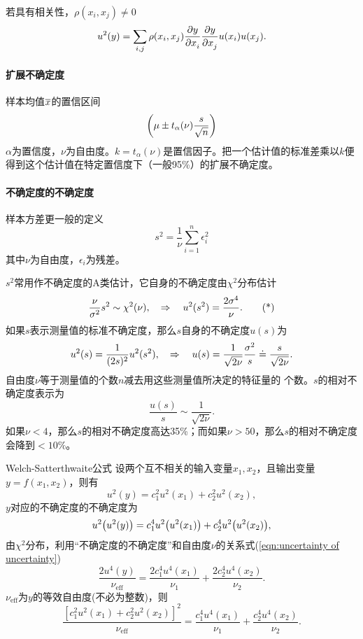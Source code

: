 若具有相关性，$\rho(x_i,x_j)\neq 0$
\begin{align}
	u^2(y)=\sum_{i,j}\rho(x_i,x_j)\pv y{x_i}\pv y{x_j}u(x_i)u(x_j).
\end{align}
\paragraph{扩展不确定度}
样本均值$\overline x$的置信区间
\[
	\biggl(\mu\pm t_{\alpha}(\nu)\frac s{\sqrt n}\biggr)
\]
$\alpha$为置信度，$\nu$为自由度。$k=t_{\alpha}(\nu)$是置信因子。把一个估计值的标准差乘以$ k $便得到这个估计值在特定置信度下（一般95\%）的扩展不确定度。
\paragraph{不确定度的不确定度}
样本方差更一般的定义
\[
	s^2=\frac1\nu\sum_{i=1}^n\epsilon_i^2
\]
其中$\nu$为自由度，$\epsilon_i$为残差。

$s^2$常用作不确定度的A类估计，它自身的不确定度由$\chi^2$分布估计
\begin{align}\label{eqn:uncertainty of uncertainty}
	\frac\nu{\sigma^2}s^2\sim\chi^2(\nu),\quad\Rightarrow\quad u^2(s^2)=\frac{2\sigma^4}\nu.\tag{*}
\end{align}
如果$ s $表示测量值的标准不确定度，那么$ s $自身的不确定度$ u(s) $为
\[
	u^2(s)=\frac1{(2s)^2}u^2(s^2),\quad\Rightarrow\quad u(s)=\frac1{\sqrt{2\nu}}\frac{\sigma^2}s\doteq\frac s{\sqrt{2\nu}}.
\]
自由度$\nu$等于测量值的个数$ n $减去用这些测量值所决定的特征量的
个数。$s $的相对不确定度表示为
\[
	\frac{u(s)}s\sim\frac1{\sqrt{2\nu}}.
\]
如果$\nu<4$，那么$ s $的相对不确定度高达35\%；而如果$\nu>50$，那么$ s $的相对不确定度会降到$<10\%$。
\begin{theorem}{Welch-Satterthwaite公式}{}
	设两个互不相关的输入变量$x_1,x_2$，且输出变量$y=f(x_1,x_2)$，则有
	\[
		u^2(y)=c_1^2u^2(x_1)+c_2^2u^2(x_2),
	\]
	$y $对应的不确定度的不确定度为
	\[
		u^2\bigl(u^2(y)\bigr)=c_1^4u^2\bigl(u^2(x_1)\bigr)+c_2^4u^2\bigl(u^2(x_2)\bigr),
	\]
	由$\chi^2$分布，利用“不确定度的不确定度”和自由度$\nu$的关系式(\ref{eqn:uncertainty of uncertainty})
	\[
		\frac{2u^4(y)}{\nu_{\mathrm{eff}}}=\frac{2c_1^4u^4(x_1)}{\nu_1}+\frac{2c_2^4u^4(x_2)}{\nu_2}.
	\]
	$\nu_{\mathrm{eff}}$为$ y $的等效自由度(不必为整数)，则
	\[
		\frac{[c_1^2u^2(x_1)+c_2^2u^2(x_2)]^2}{\nu_{\mathrm{eff}}}=\frac{c_1^4u^4(x_1)}{\nu_1}+\frac{c_2^4u^4(x_2)}{\nu_2}.
	\]
\end{theorem}

\iffalse
\begin{compactenum}
	\item 
\end{compactenum}
\begin{compactitem}
	\item 
\end{compactitem}
\fi
\printindex
